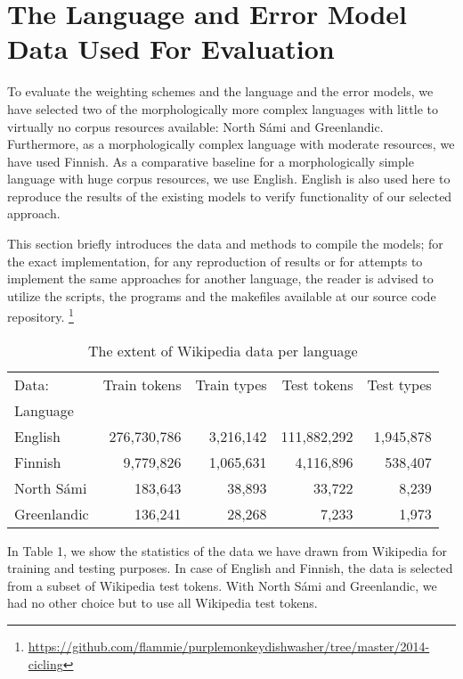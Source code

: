 \documentclass[postprint]{flammie}
\begin{document}
\section{The Language and Error Model Data Used For Evaluation}

To evaluate the weighting schemes and the language and the error models, we
have selected two of the morphologically more complex languages with little to
virtually no corpus resources available: North Sámi and Greenlandic.
Furthermore, as a morphologically complex language with moderate resources,
we have used Finnish. As a comparative baseline for a morphologically simple
language with huge corpus resources, we use English. English is also used
here to reproduce the results of the existing models to verify functionality
of our selected approach.

This section briefly introduces the data and methods to compile the models; for
the exact implementation, for any reproduction of results or for attempts to
implement the same approaches for another language, the reader is advised to
utilize the scripts, the programs and the makefiles available at our source
code repository.
\footnote{\url{https://github.com/flammie/purplemonkeydishwasher/tree/master/2014-cicling}}

\begin{table}
    \caption{The extent of Wikipedia data per language}
    \begin{tabular}{lrrrr}
Data: & Train tokens & Train types & Test tokens & Test types \\
            Language & & & & \\
English & 276,730,786 & 3,216,142 & 111,882,292 & 1,945,878 \\
            Finnish & 9,779,826 & 1,065,631 & 4,116,896 & 538,407 \\
            North Sámi & 183,643 & 38,893 & 33,722 & 8,239 \\
            Greenlandic & 136,241 & 28,268 & 7,233 & 1,973 \\
    \end{tabular}
\end{table}

In Table 1, we show the statistics of the data we have drawn from Wikipedia for
training and testing purposes. In case of English and Finnish, the data is
selected from a subset of Wikipedia test tokens. With North Sámi and
Greenlandic, we had no other choice but to use all Wikipedia test tokens.
\end{document}
